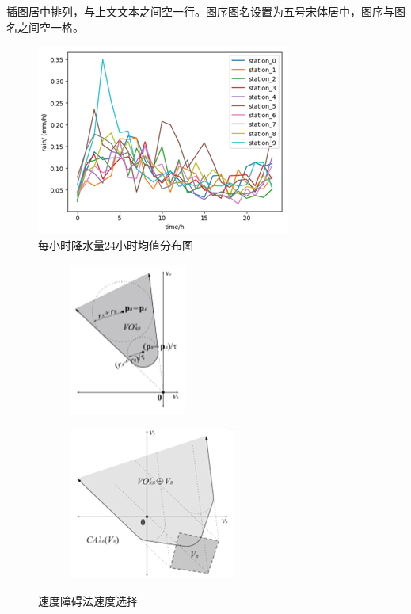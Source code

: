 \begin{spacing}{1.5}
    插图居中排列，与上文文本之间空一行。图序图名设置为五号宋体居中，图序与图名之间空一格。
    
    \begin{figure}[bhp]
        \centering
        \includegraphics[scale=1]{figures/rainfall.png}
        \caption{每小时降水量24小时均值分布图}
        \label{rainfall}
    \end{figure}
    
    \begin{figure}
        \centering
        \begin{subfigure}{0.35\textwidth}
            \includegraphics[width=3.83cm,height=5cm]{figures/speed-barrier-a.png}
        \end{subfigure}
        \begin{subfigure}{0.35\textwidth}
            \includegraphics[height=5cm,width=5.51cm]{figures/speed-barrier-b.png}
        \end{subfigure}
        \caption{速度障碍法速度选择}
        \label{speed}
    \end{figure}
    

\end{spacing}
